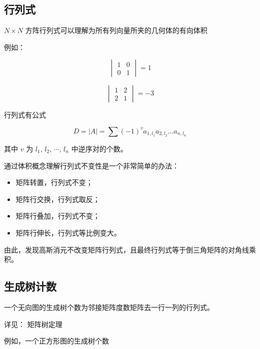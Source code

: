 \hr

\subsection{行列式}

$N \times N$ 方阵行列式可以理解为所有列向量所夹的几何体的有向体积

例如：

$$
\begin{vmatrix}
1 & 0 \\
0 & 1 \end{vmatrix} = 1
$$

$$
\begin{vmatrix}
1 & 2 \\
2 & 1 \end{vmatrix} = -3
$$

行列式有公式

$$
D = \left| A \right| = \sum(-1)^va_{1,l_1}a_{2,l_2}\dots a_{n,l_n}
$$

\begin{QUOTE}{}{}
其中 $v$ 为 $l_1$, $l_2$, $\cdots$, $l_n$ 中逆序对的个数。
\end{QUOTE}

通过体积概念理解行列式不变性是一个非常简单的办法：

\begin{itemize}
\item 矩阵转置，行列式不变；
\item 矩阵行交换，行列式取反；
\item 矩阵行叠加，行列式不变；
\item 矩阵行伸长，行列式等比例变大。
\end{itemize}

\begin{QUOTE}{}{}
由此，发现高斯消元不改变矩阵行列式，且最终行列式等于倒三角矩阵的对角线乘积。
\end{QUOTE}

\hr

\subsection{生成树计数}

一个无向图的生成树个数为邻接矩阵度数矩阵去一行一列的行列式。

详见： 矩阵树定理 

例如，一个正方形图的生成树个数

